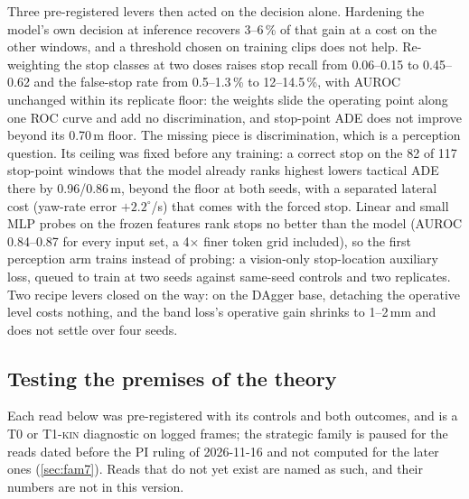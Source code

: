 \documentclass[10pt,twocolumn]{article}
\theoremstyle{remark}
\newcommand{\tier}[1]{\textsc{\small #1}}
\begin{document}
Three pre-registered levers then acted on the decision alone. Hardening the model's own decision at inference recovers 3--6\,\% of that gain at a cost on the other windows, and a threshold chosen on training clips does not help. Re-weighting the stop classes at two doses raises stop recall from 0.06--0.15 to 0.45--0.62 and the false-stop rate from 0.5--1.3\,\% to 12--14.5\,\%, with AUROC unchanged within its replicate floor: the weights slide the operating point along one ROC curve and add no discrimination, and stop-point ADE does not improve beyond its 0.70\,m floor. The missing piece is discrimination, which is a perception question. Its ceiling was fixed before any training: a correct stop on the 82 of 117 stop-point windows that the model already ranks highest lowers tactical ADE there by 0.96/0.86\,m, beyond the floor at both seeds, with a separated lateral cost (yaw-rate error $+2.2^{\circ}$/s) that comes with the forced stop. Linear and small MLP probes on the frozen features rank stops no better than the model (AUROC 0.84--0.87 for every input set, a 4$\times$ finer token grid included), so the first perception arm trains instead of probing: a vision-only stop-location auxiliary loss, queued to train at two seeds against same-seed controls and two replicates. Two recipe levers closed on the way: on the DAgger base, detaching the operative level costs nothing, and the band loss's operative gain shrinks to 1--2\,mm and does not settle over four seeds.

\subsection{Testing the premises of the theory}\label{sec:premises}
Each read below was pre-registered with its controls and both outcomes, and is a \tier{T0} or \tier{T1-kin} diagnostic on logged
frames; the strategic family is paused for the reads dated before the PI ruling of 2026-11-16 and not computed for the later ones (\cref{sec:fam7}). Reads that do not yet exist are named as such, and their numbers are not in this version.
\end{document}
